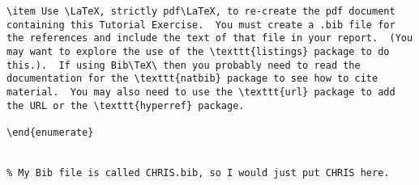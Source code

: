 \begin{lstlisting}
\item Use \LaTeX, strictly pdf\LaTeX, to re-create the pdf document
containing this Tutorial Exercise.  You must create a .bib file for
the references and include the text of that file in your report.  (You
may want to explore the use of the \texttt{listings} package to do
this.).  If using Bib\TeX\ then you probably need to read the
documentation for the \texttt{natbib} package to see how to cite
material.  You may also need to use the \texttt{url} package to add
the URL or the \texttt{hyperref} package.

\end{enumerate}

 
% My Bib file is called CHRIS.bib, so I would just put CHRIS here. 



\end{lstlisting}


